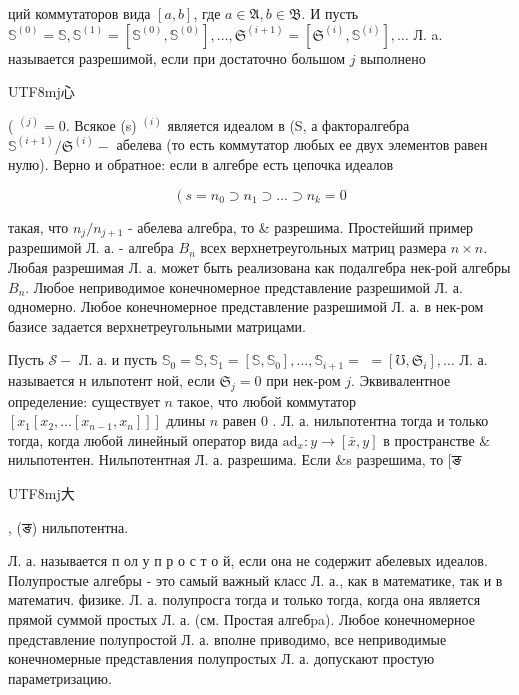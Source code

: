 \documentclass[10pt]{article}
\begin{document}
ций коммутаторов вида $[a, b]$, где $a \in \mathfrak{A}, b \in \mathfrak{B}$. И пусть $\mathbb{S}^{(0)}=\mathbb{S}, \mathbb{S}^{(1)}=\left[\mathbb{S}^{(0)}, \mathbb{S}^{(0)}\right], \ldots, \mathfrak{S}^{(i+1)}=\left[\mathfrak{S}^{(i)}, \mathbb{S}^{(i)}\right], \ldots$ Л. a. называется разрешимой, если при достаточно большом $j$ выполнено \begin{CJK}{UTF8}{mj}心\end{CJK}( ${ }^{(j)}=0$. Всякое (s) ${ }^{(i)}$ является идеалом в (S, а факторалгебра $\mathbb{S}^{(i+1)} / \mathfrak{S}^{(i)}-$ абелева (то есть коммутатор любых ее двух элементов равен нулю). Верно и обратное: если в алгебре есть цепочка идеалов



\[

\left(s=n_{0} \supset n_{1} \supset \ldots \supset n_{k}=0\right.

\]



такая, что $n_{j} / n_{j+1}$ - абелева алгебра, то \& разрешима. Простейший пример разрешимой Л. а. - алгебра $B_{n}$ всех верхнетреугольных матриц размера $n \times n$. Любая разрешимая Л. а. может быть реализована как подалгебра нек-рой алгебры $B_{n}$. Любое неприводимое конечномерное представление разрешимой Л. а. одномерно. Любое конечномерное представление разрешимой Л. а. в нек-ром базисе задается верхнетреугольными матрицами.



Пусть $\mathscr{S}-$ Л. а. и пусть $\mathbb{S}_{0}=\mathbb{S}, \mathbb{S}_{1}=\left[\mathbb{S}, \mathbb{S}_{0}\right], \ldots, \mathbb{S}_{i+1}=$ $=\left[\mathbb{\mho}, \mathfrak{S}_{i}\right], \ldots$ Л. а. называется н ильпотент ной, если $\mathfrak{S}_{j}=0$ при нек-ром $j$. Эквивалентное определение: существует $n$ такое, что любой коммутатор $\left[x_{1}\left[x_{2}, \ldots\left[x_{n-1}, x_{n}\right]\right]\right]$ длины $n$ равен 0 . Л. а. нильпотентна тогда и только тогда, когда любой линейный оператор вида $\mathrm{ad}_{x}: y \rightarrow[\bar{x}, y]$ в пространстве \& нильпотентен. Нильпотентная Л. а. разрешима. Если \&s разрешима, то [ङ\begin{CJK}{UTF8}{mj}大\end{CJK}, (ङ) нильпотентна.



Л. а. называется п ол у п р о с т о й, если она не содержит абелевых идеалов. Полупростые алгебры - это самый важный класс Л. а., как в математике, так и в математич. физике. Л. а. полупросга тогда и только тогда, когда она является прямой суммой простых Л. а. (см. Простая алгебpa). Любое конечномерное представление полупростой Л. а. вполне приводимо, все неприводимые конечномерные представления полупростых Л. а. допускают простую параметризацию.
\end{document}
